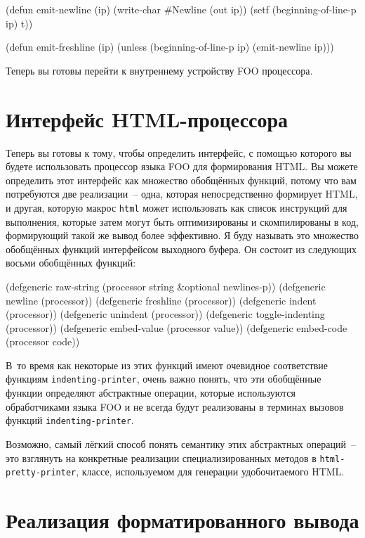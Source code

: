 \begin{myverb}
(defun emit-newline (ip)
  (write-char #\bslash{}Newline (out ip))
  (setf (beginning-of-line-p ip) t))

(defun emit-freshline (ip)
  (unless (beginning-of-line-p ip) (emit-newline ip)))
\end{myverb}

Теперь вы готовы перейти к внутреннему устройству FOO процессора. 

\section{Интерфейс HTML-процессора}

Теперь вы готовы к тому, чтобы определить интерфейс, с помощью которого вы будете
использовать процессор языка FOO для формирования HTML. Вы можете определить этот
интерфейс как множество обобщённых функций, потому что вам потребуются две реализации~--
одна, которая непосредственно формирует HTML, и другая, которую макрос \lstinline{html} может
использовать как список инструкций для выполнения, которые затем могут быть оптимизированы
и скомпилированы в код, формирующий такой же вывод более эффективно. Я буду называть это
множество обобщённых функций интерфейсом выходного буфера. Он состоит из следующих восьми
обобщённых функций:

\begin{myverb}
(defgeneric raw-string (processor string &optional newlines-p))
(defgeneric newline (processor))
(defgeneric freshline (processor))
(defgeneric indent (processor))
(defgeneric unindent (processor))
(defgeneric toggle-indenting (processor))
(defgeneric embed-value (processor value))
(defgeneric embed-code (processor code))
\end{myverb}

В~то время как некоторые из этих функций имеют очевидное соответствие функциям
\lstinline{indenting-printer}, очень важно понять, что эти обобщённые функции определяют
абстрактные операции, которые используются обработчиками языка FOO и не всегда будут
реализованы в терминах вызовов функций \lstinline{indenting-printer}.

Возможно, самый лёгкий способ понять семантику этих абстрактных операций~-- это взглянуть на
конкретные реализации специализированных методов в \lstinline{html-pretty-printer}, классе,
используемом для генерации удобочитаемого HTML.

\section{Реализация форматированного вывода}

